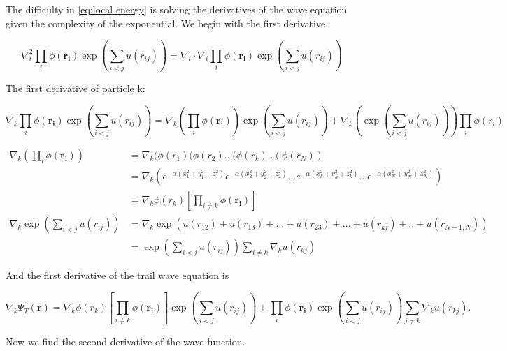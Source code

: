 The difficulty in \eqref{eq:local energy} is solving the derivatives of the wave equation given the complexity of the exponential. We begin with the first derivative.

$$\nabla_i^2 \prod_{i} \phi (\mathbf{r_i}) \exp \left(\sum_{i<j}u(r_{ij})\right) = \nabla_i \cdot \nabla_i \prod_{i} \phi (\mathbf{r_i}) \exp \left(\sum_{i<j}u(r_{ij})\right)$$

The first derivative of particle k:

$$\nabla_k \prod_{i} \phi (\mathbf{r_i}) \exp \left(\sum_{i<j}u(r_{ij})\right) = \nabla_k \left( \prod_{i} \phi (\mathbf{r_i}) \right) \exp \left(\sum_{i<j}u(r_{ij})\right) + \nabla_k \left(\exp \left(\sum_{i<j}u(r_{ij})\right)\right)  \prod_{i} \phi (r_i) $$

\begin{align*}
\nabla_k \left( \prod_{i} \phi (\mathbf{r_i}) \right) &= \nabla_k (\phi(r_1)(\phi(r_2)...(\phi(r_k)..(\phi(r_N)) \\
&=\nabla_k \left(e^{-\alpha (x_1^2 + y_1^2 + z_1^2)} e^{-\alpha (x_2^2 + y_2^2 + z_2^2)} ... e^{-\alpha (x_k^2 + y_k^2 + z_k^2)} ... e^{-\alpha (x_N^2 + y_N^2 + z_N^2)}\right)\\
&=\nabla_k \phi(r_k) \left[\prod_{i\ne k} \phi(\mathbf{r_i})\right]\\
\nabla_k \exp \left(\sum_{i<j}u(r_{ij})\right) &= \nabla_k \exp (u(r_{12}) + u(r_{13}) + ... + u(r_{23}) + ... + u(r_{kj}) + .. + u(r_{N-1,N}) )\\
&=\exp \left(\sum_{i<j}u(r_{ij})\right) \sum_{i\ne k} \nabla_k u(r_{kj})
\end{align*}

And the first derivative of the trail wave equation is

$$\nabla_k \Psi_T(\mathbf{r}) = \nabla_k \phi(r_k) \left[\prod_{i\ne k} \phi(\mathbf{r_i})\right] \exp \left(\sum_{i<j}u(r_{ij})\right) +  \prod_{i} \phi (\mathbf{r_i}) \exp \left(\sum_{i<j}u(r_{ij})\right) \sum_{j\ne k} \nabla_k u(r_{kj}).$$

Now we find the second derivative of the wave function.

